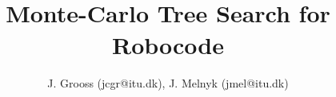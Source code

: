 \documentclass[conference]{IEEEtran}
\begin{document}
\title{\ \\ \LARGE\bf Monte-Carlo Tree Search for Robocode}

\author{J. Grooss (jcgr@itu.dk), J. Melnyk (jmel@itu.dk)}


\maketitle



















\end{document}

